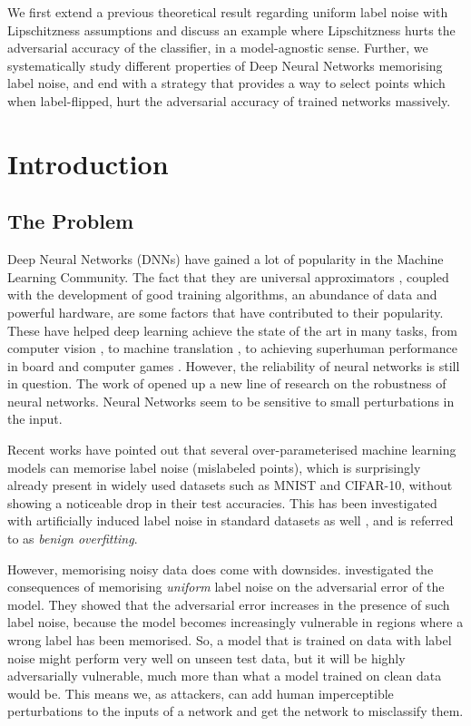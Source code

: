 \documentclass{ociamthesis}
\begin{document}
We first extend a previous theoretical result regarding uniform label noise with
Lipschitzness assumptions and discuss an example where Lipschitzness hurts the
adversarial accuracy of the classifier, in a model-agnostic sense. Further, we
systematically study different properties of Deep Neural Networks memorising
label noise, and end with a strategy that provides a way to select points which
when label-flipped, hurt the adversarial accuracy of trained networks massively.

\tableofcontents

\chapter{Introduction}

\section{The Problem}

Deep Neural Networks (DNNs) have gained a lot of popularity in the Machine
Learning Community. The fact that they are universal approximators
\citep{hornik1989multilayer}, coupled with the development of good training
algorithms, an abundance of data and powerful hardware, are some factors that
have contributed to their popularity. These have helped deep learning achieve
the state of the art in many tasks, from computer vision \citep{imagenet}, to
machine translation \citep{seq2seq,attention-is-all-you-need}, to achieving
superhuman performance in board and computer games \citep{alpha-zero,
starcraft}. However, the reliability of neural networks is still in question.
The work of \citet{42503} opened up a new line of research on the robustness of
neural networks. Neural Networks seem to be sensitive to small perturbations in
the input.

Recent works \citep{belkin2018understand,DBLP:journals/cacm/ZhangBHRV21} have
pointed out that several over-parameterised machine learning models can memorise
label noise (mislabeled points), which is surprisingly already present in widely
used datasets \citep{sanyal2021how} such as MNIST and CIFAR-10, without showing
a noticeable drop in their test accuracies. This has been investigated with
artificially induced label noise in standard datasets as well
\citep{sanyal2021how}, and is referred to as \emph{benign overfitting}.

However, memorising noisy data does come with downsides. \citet{sanyal2021how}
investigated the consequences of memorising \emph{uniform} label noise on the
adversarial error of the model. They showed that the adversarial error increases
in the presence of such label noise, because the model becomes increasingly
vulnerable in regions where a wrong label has been memorised. So, a model that
is trained on data with label noise might perform very well on unseen test data,
but it will be highly adversarially vulnerable, much more than what a model
trained on clean data would be. This means we, as attackers, can add human
imperceptible perturbations to the inputs of a network and get the network to
misclassify them.
\end{document}

